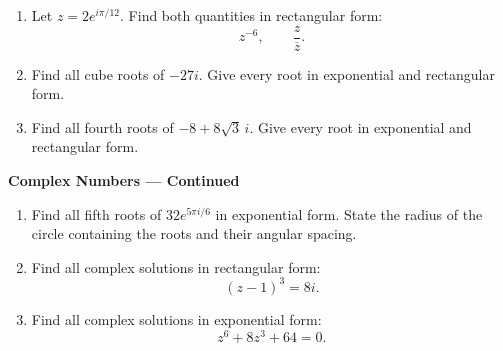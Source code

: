 \documentclass[11pt]{article}
\begin{document}
\begin{enumerate}[leftmargin=*,itemsep=0pt,resume]
  \item Let $z=2e^{i\pi/12}$. Find both quantities in rectangular form:
  \[
    z^{-6},\qquad \frac{z}{\overline z}.
  \]
  \par{}

  \item Find all cube roots of $-27i$. Give every root in exponential
  and rectangular form.
  \par{}

  \item Find all fourth roots of $-8+8\sqrt3\,i$. Give every root in
  exponential and rectangular form.
  \par{}
\end{enumerate}

\newpage
\begin{center}
  {\large\textbf{Complex Numbers --- Continued}}
\end{center}

\begin{enumerate}[leftmargin=*,itemsep=0pt,resume]
  \item Find all fifth roots of $32e^{5\pi i/6}$ in exponential form.
  State the radius of the circle containing the roots and their angular spacing.
  \par{}

  \item Find all complex solutions in rectangular form:
  \[
    (z-1)^3=8i.
  \]
  \par{}

  \item Find all complex solutions in exponential form:
  \[
    z^6+8z^3+64=0.
  \]
  \par{}
\end{enumerate}
\end{document}
